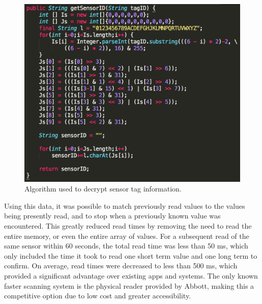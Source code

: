 \begin{figure}[ht]
\centering\includegraphics[width=0.75\linewidth]{images/sensortagalgo.png}
\caption{Algorithm used to decrypt sensor tag information.}
\label{fig:sensortagalgo}
\end{figure}

Using this data, it was possible to match previously read values to the values being presently read, and to stop when a previously known value was encountered. This greatly reduced read times by removing the need to read the entire memory, or even the entire array of values. For a subsequent read of the same sensor within 60 seconds, the total read time was less than 50 ms, which only included the time it took to read one short term value and one long term to confirm. On average, read times were decreased to less than 500 ms, which provided a significant advantage over existing apps and systems. The only known faster scanning system is the physical reader provided by Abbott, making this a competitive option due to low cost and greater accessibility.